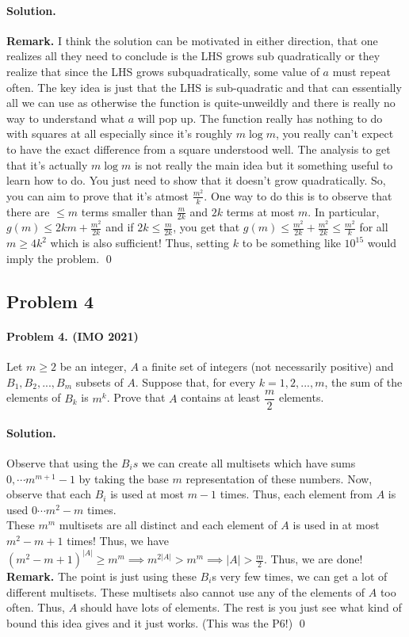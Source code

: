 \documentclass[12pt]{article}
\newenvironment{solution}
{\paragraph{Solution.}}
{\qed\eject}
\begin{document}
\begin{solution}
    \textbf{Remark.} I think the solution can be motivated in either direction, that one realizes all they need to conclude is the LHS grows sub quadratically or they realize that since the LHS grows subquadratically, some value of $a$ must repeat often. The key idea is just that the LHS is sub-quadratic and that can essentially all we can use as otherwise the function is quite-unweildly and there is really no way to understand what $a$ will pop up. The function really has nothing to do with squares at all especially since it's roughly $m\log m$, you really can't expect to have the exact difference from a square understood well. The analysis to get that it's actually $m\log m$ is not really the main idea but it something useful to learn how to do. You just need to show that it doesn't grow quadratically. So, you can aim to prove that it's atmost $\frac{m^2}{k}$. One way to do this is to observe that there are $\le m$ terms smaller than $\frac{m}{2k}$ and $2k$ terms at most $m$. In particular, $g(m)\le 2km+\frac{m^2}{2k}$ and if $2k\le \frac{m}{2k}$, you get that $g(m)\le \frac{m^2}{2k}+\frac{m^2}{2k}\le \frac{m^2}{k}$ for all $m\ge 4k^2$ which is also sufficient! Thus, setting $k$ to be something like $10^{15}$ would imply the problem.
\end{solution}


\subsection*{Problem 4}
\paragraph*{\textbf{Problem 4. (IMO 2021)}} Let $m\ge 2$ be an integer, $A$ a finite set of integers (not necessarily positive) and $B_1,B_2,...,B_m$ subsets of $A$. Suppose that, for every $k=1,2,...,m$, the sum of the elements of $B_k$ is $m^k$. Prove that $A$ contains at least $\dfrac{m}{2}$ elements.

\begin{solution}
    Observe that using the $B_is$ we can create all multisets which have sums $0,\cdots m^{m+1}-1$ by taking the base $m$ representation of these numbers. Now, observe that each $B_i$ is used at most $m-1$ times. Thus, each element from $A$ is used $0\cdots m^2-m$ times.\\

    These $m^m$ multisets are all distinct and each element of $A$ is used in at most $m^2-m+1$ times! Thus, we have $(m^2-m+1)^{|A|}\ge m^m\implies m^{2|A|}>m^m\implies |A|>\frac{m}{2}$. Thus, we are done!\\

    \textbf{Remark.} The point is just using these $B_i$s very few times, we can get a lot of different multisets. These multisets also cannot use any of the elements of $A$ too often. Thus, $A$ should have lots of elements. The rest is you just see what kind of bound this idea gives and it just works. (This was the P6!)
\end{solution}
\end{document}
